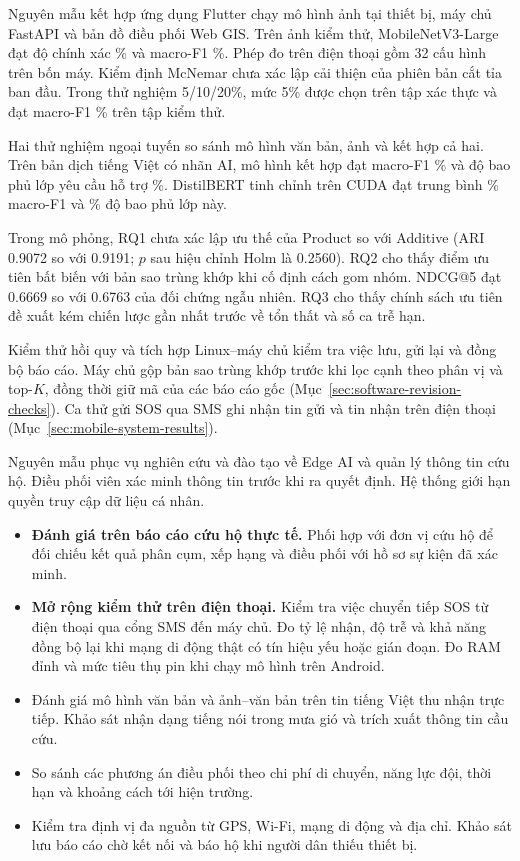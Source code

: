 \label{chap:conclusion}
Nguyên mẫu kết hợp ứng dụng Flutter chạy mô hình ảnh tại thiết bị, máy chủ FastAPI và bản đồ điều phối Web GIS. Trên \ImageTest{} ảnh kiểm thử, MobileNetV3-Large đạt độ chính xác \NewImageAccuracy\% và macro-F1 \NewImageMacroFOne\%. Phép đo trên điện thoại gồm 32 cấu hình trên bốn máy. Kiểm định McNemar chưa xác lập cải thiện của phiên bản cắt tỉa ban đầu. Trong thử nghiệm 5/10/20\%, mức 5\% được chọn trên tập xác thực và đạt macro-F1 \LocalPrunedFOne\% trên tập kiểm thử.

Hai thử nghiệm ngoại tuyến so sánh mô hình văn bản, ảnh và kết hợp cả hai. Trên bản dịch tiếng Việt có nhãn AI, mô hình kết hợp đạt macro-F1 \VISilverFusionFOne\% và độ bao phủ lớp yêu cầu hỗ trợ \VISilverFusionRecall\%. DistilBERT tinh chỉnh trên CUDA đạt trung bình \VISilverFineFOne\% macro-F1 và \VISilverFineRecall\% độ bao phủ lớp này.

Trong mô phỏng, RQ1 chưa xác lập ưu thế của Product so với Additive (ARI 0.9072 so với 0.9191; $p$ sau hiệu chỉnh Holm là 0.2560). RQ2 cho thấy điểm ưu tiên bất biến với bản sao trùng khớp khi cố định cách gom nhóm. NDCG@5 đạt 0.6669 so với 0.6763 của đối chứng ngẫu nhiên. RQ3 cho thấy chính sách ưu tiên đề xuất kém chiến lược gần nhất trước về tổn thất và số ca trễ hạn.

Kiểm thử hồi quy và tích hợp Linux--máy chủ kiểm tra việc lưu, gửi lại và đồng bộ báo cáo. Máy chủ gộp bản sao trùng khớp trước khi lọc cạnh theo phân vị và top-$K$, đồng thời giữ mã của các báo cáo gốc (Mục~\ref{sec:software-revision-checks}). Ca thử gửi SOS qua SMS ghi nhận tin gửi và tin nhận trên điện thoại (Mục~\ref{sec:mobile-system-results}).

Nguyên mẫu phục vụ nghiên cứu và đào tạo về Edge AI và quản lý thông tin cứu hộ. Điều phối viên xác minh thông tin trước khi ra quyết định. Hệ thống giới hạn quyền truy cập dữ liệu cá nhân.

\label{sec:future-work}
\begin{itemize}
\item \textbf{Đánh giá trên báo cáo cứu hộ thực tế.} Phối hợp với đơn vị cứu hộ để đối chiếu kết quả phân cụm, xếp hạng và điều phối với hồ sơ sự kiện đã xác minh.
\item \textbf{Mở rộng kiểm thử trên điện thoại.} Kiểm tra việc chuyển tiếp SOS từ điện thoại qua cổng SMS đến máy chủ. Đo tỷ lệ nhận, độ trễ và khả năng đồng bộ lại khi mạng di động thật có tín hiệu yếu hoặc gián đoạn. Đo RAM đỉnh và mức tiêu thụ pin khi chạy mô hình trên Android.
\item Đánh giá mô hình văn bản và ảnh--văn bản trên tin tiếng Việt thu nhận trực tiếp. Khảo sát nhận dạng tiếng nói trong mưa gió và trích xuất thông tin cầu cứu.
\item So sánh các phương án điều phối theo chi phí di chuyển, năng lực đội, thời hạn và khoảng cách tới hiện trường.
\item Kiểm tra định vị đa nguồn từ GPS, Wi-Fi, mạng di động và địa chỉ. Khảo sát lưu báo cáo chờ kết nối và báo hộ khi người dân thiếu thiết bị.
\end{itemize}
